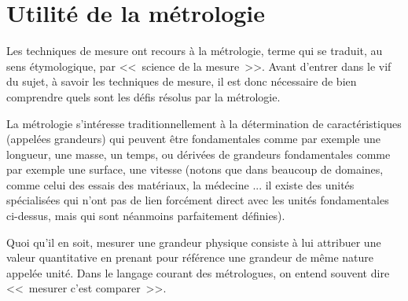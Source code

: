\section{Utilité de la métrologie}

Les techniques de mesure ont recours à la métrologie, terme qui se traduit, au sens étymologique, par \textless\textless\ science de la mesure\ \textgreater\textgreater. Avant d'entrer dans le vif du sujet, à savoir les techniques de mesure, il est donc nécessaire de bien comprendre quels sont les défis résolus par la métrologie.

La métrologie s'intéresse traditionnellement à la détermination de caractéristiques (appelées grandeurs) qui peuvent être fondamentales comme par exemple une longueur, une masse, un temps, ou dérivées de grandeurs fondamentales comme par exemple une surface, une vitesse (notons que dans beaucoup de domaines, comme celui des essais des matériaux, la médecine ... il existe des unités spécialisées qui n'ont pas de lien forcément direct avec les unités fondamentales ci-dessus, mais qui sont néanmoins parfaitement définies).

Quoi qu'il en soit, mesurer une grandeur physique consiste à lui attribuer une valeur quantitative en prenant pour référence une grandeur de même nature appelée unité. Dans le langage courant des métrologues, on entend souvent dire \textless\textless\ mesurer c'est comparer\ \textgreater\textgreater.

